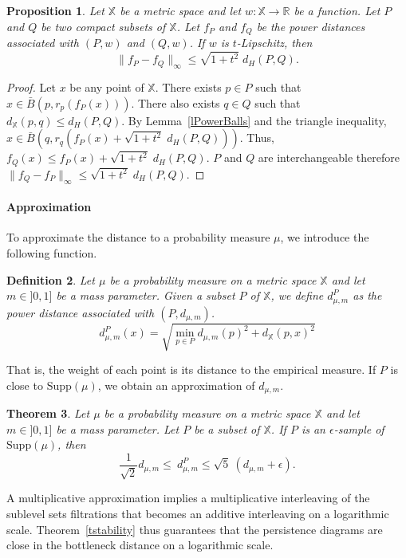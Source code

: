 \documentclass[a4paper]{article}
\newcommand\norm[1]{\|#1\|}
\newcommand\dm{d_{\mu,m}}
\newcommand\dPm{d_{\mu,m}^P}
\newcommand\X{\mathbb{X}}
\newcommand\R{\mathbb{R}}
\newcommand\dX[2]{d_\X(#1,#2)}
\newcommand\Supp[1]{\mathrm{Supp}(#1)}
\newtheorem{theorem}{Theorem}[section]
\newtheorem{definition}[theorem]{Definition}
\newtheorem{proposition}[theorem]{Proposition}
\begin{document}
  \begin{proposition}\label{pPowerBalls}
    Let $\X$ be a metric space and let $w:\X\to\R$ be a function.
    Let $P$ and $Q$ be two compact subsets of $\X$.
    Let $f_P$ and $f_Q$ be the power distances associated with $(P,w)$ and $(Q,w)$.
    If $w$ is $t$-Lipschitz, then
    \[
      \norm{f_P-f_Q}_\infty \le \sqrt{1+t^2}\;d_H(P,Q).
    \]
  \end{proposition}
  \begin{proof}
    Let $x$ be any point of $\X$.
    There exists $p\in P$ such that $x\in \bar{B}(p,r_p(f_P(x)))$.
    There also exists $q\in Q$ such that $\dX{p}{q} \le d_H(P,Q)$.
    By Lemma~\ref{lPowerBalls} and the triangle inequality, $x\in\bar{B}(q,r_q(f_P(x) + \sqrt{1+t^2}\;d_H(P,Q)))$.
    Thus, $f_Q(x) \le f_P(x) + \sqrt{1+t^2}\;d_H(P,Q)$.
    $P$ and $Q$ are interchangeable therefore $\norm{f_Q-f_P}_\infty \le \sqrt{1+t^2}\;d_H(P,Q)$.
\end{proof}

\paragraph{Approximation\\}
To approximate the distance to a probability measure $\mu$, we introduce the following function.

\begin{definition}\label{dDpd}
  Let $\mu$ be a probability measure on a metric space $\X$ and let $m\in]0,1]$ be a mass parameter.
  Given a subset $P$ of $\X$, we define $\dPm$ as the power distance associated with $(P,\dm)$.
  \[
    \dPm(x)=\sqrt{\min_{p\in P}\dm(p)^2+\dX{p}{x}^2}  
  \]
\end{definition}
That is, the weight of each point is its distance to the empirical measure.
If $P$ is close to $\Supp{\mu}$, we obtain an approximation of $\dm$.

\begin{theorem}\label{tPbound}
Let $\mu$ be a probability measure on a metric space $\X$ and let $m\in]0,1]$ be a mass parameter.
Let $P$ be a subset of $\X$.
If $P$ is an $\epsilon$-sample of $\Supp{\mu}$, then
$$\frac{1}{\sqrt{2}}\dm\leq\ \dPm\leq\sqrt{5}\ (\dm+\epsilon).$$
\end{theorem}

A multiplicative approximation implies a multiplicative interleaving of the sublevel sets filtrations that becomes an additive interleaving on a logarithmic scale.
Theorem~\ref{tstability} thus guarantees that the persistence diagrams are close in the bottleneck distance on a logarithmic scale.
\end{document}
